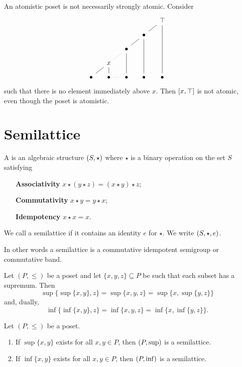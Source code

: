 \begin{example}
An atomistic poset is not necessarily strongly atomic. Consider
\[ \begin{tikzcd}[column sep=small, row sep=small]
&&&& {\top} \ar[dddd, dash] \\
&&& {\bullet} \ar[ur, dash] \ar[ddd, dash] & \\
&& {\bullet} \ar[ur, dash] \ar[dd, dash] && \\
& {x} \ar[ur, dotted, no head] \ar[d, dash] &&& \\
{\bullet} \ar[ur, dash] & {\bullet} \ar[r, dotted, no head] & {\bullet} & {\bullet} & {\bullet}
\end{tikzcd} \]
such that there is no element immediately above $x$. Then $\interval{x,\top}$ is not atomic, even though the poset is atomistic.
\end{example}


\chapter{Semilattice}
\begin{definition}
A  is an algebraic structure $\sSet{S,\star}$ where $\star$ is a binary operation on the set $S$ satisfying
\begin{itemize}[leftmargin=2.5cm]
\item[\textbf{Associativity}] $x\star (y\star z) = (x\star y) \star z$;
\item[\textbf{Commutativity}] $x \star y = y \star x$;
\item[\textbf{Idempotency}] $x\star x = x$.
\end{itemize}
We call a semilattice  if it contains an identity $e$ for $\star$. We write $\sSet{S, \star, e}$.
\end{definition}
In other words a semilattice is a commutative idempotent semigroup or commutative band.

\begin{lemma}
Let $(P,\leq)$ be a poset and let $\{x,y,z\}\subseteq P$ be such that each subset has a supremum. Then
\[ \sup\{\sup\{x,y\},z\} = \sup\{x,y,z\} = \sup\{x,\sup\{y,z\}\} \]
and, dually,
\[ \inf\{\inf\{x,y\},z\} = \inf\{x,y,z\} = \inf\{x,\inf\{y,z\}\}. \]
\end{lemma}
\begin{corollary}
Let $(P,\leq)$ be a poset.
\begin{enumerate}
\item If $\sup\{x,y\}$ exists for all $x,y\in P$, then $\sSet{P,\sup}$ is a semilattice.
\item If $\inf\{x,y\}$ exists for all $x,y\in P$, then $\sSet{P,\inf}$ is a semilattice.
\end{enumerate}
\end{corollary}

